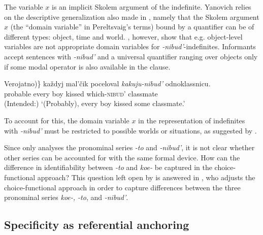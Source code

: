 \documentclass[output=paper,colorlinks,citecolor=brown]{langscibook}
\begin{document}
\noindent The variable $x$ is an implicit Skolem argument of the indefinite. Yanovich relies on the descriptive generalization also made in \citet{Pereltsvaig2008}, namely that the Skolem argument $x$ (the “domain variable” in Pereltsvaig’s terms) bound by a quantifier can be of different types: object, time and world. \citet{Onea.Geist2011}, however, show that e.g. object-level variables are not appropriate domain variables for \textit{-nibud’}-indefinites. Informants accept sentences with \textit{-nibud’} and a universal quantifier ranging over objects only if some modal operator is also available in the clause.

\ea\label{geist:ex:anti-yan}
\gll \minsp{\{*(} Verojatno)\} každyj mal’čik poceloval \textit{kakuju-nibud’} odnoklassnicu.\\
{} probable every boy kissed which-\textsc{nibud'} classmate\\
 \glt (Intended:) ‘(Probably), every boy kissed some classmate.’
\z

\noindent To account for this, the domain variable $x$ in the representation of indefinites with \textit{-nibud’} must be restricted to possible worlds or situations, as suggested by \citet{Onea.Geist2011}.  

Since \citet{Yanovich2005} only analyses the pronominal series \textit{-to} and \textit{-nibud’}, it is not clear whether other series can be accounted for with the same formal device. How can the difference in identifiability between \textit{-to} and \textit{koe-} be captured in the choice-functional approach? This question left open by \citet{Yanovich2005} is answered in \citet{Geist2008}, who adjusts the choice-functional approach in order to capture differences between the three pronominal series \textit{koe-, -to}, and \textit{-nibud’}. 

\subsection{Specificity as referential anchoring}\label{geist:sec:anchoring}
\end{document}
